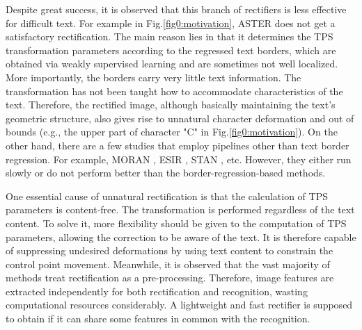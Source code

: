 \documentclass{article}
\begin{document}
Despite great success, it is observed that this branch of rectifiers is less effective for difficult text. For example in Fig.\ref{fig0:motivation}, ASTER \cite{shi2018aster} does not get a satisfactory rectification. The main reason lies in that it determines the TPS transformation parameters according to the regressed text borders, which are obtained via weakly supervised learning and are sometimes not well localized. More importantly, the borders carry very little text information. The transformation has not been taught how to accommodate characteristics of the text. Therefore, the rectified image, although basically maintaining the text's geometric structure, also gives rise to unnatural character deformation and out of bounds (e.g., the upper part of character "C" in Fig.\ref{fig0:motivation}). On the other hand, there are a few studies that employ pipelines other than text border regression. For example, MORAN \cite{cluo2019moran}, ESIR \cite{zhan2019esir}, STAN \cite{lin2021stan}, etc. However, they either run slowly or do not perform better than the border-regression-based methods.

One essential cause of unnatural rectification is that the calculation of TPS parameters is content-free. The transformation is performed regardless of the text content. To solve it, more flexibility should be given to the computation of TPS parameters, allowing the correction to be aware of the text. It is therefore capable of suppressing undesired deformations by using text content to constrain the control point movement. Meanwhile, it is observed that the vast majority of methods treat rectification as a pre-processing. Therefore, image features are extracted independently for both rectification and recognition, wasting computational resources considerably. A lightweight and fast rectifier is supposed to obtain if it can share some features in common with the recognition. 
\end{document}
